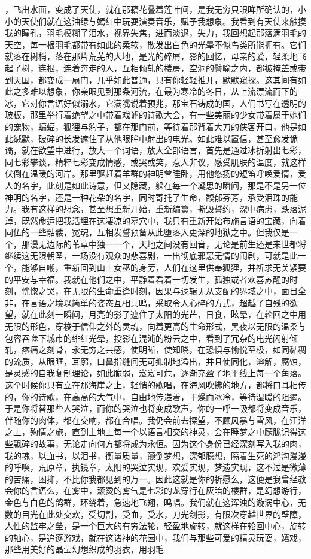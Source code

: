 \documentclass[UTF8]{article}
\begin{document}
，飞出水面，变成了天使，就在那藕花叠着莲叶间，是我无穷只眼眸所确认的，小小的天使们就在这油绿与嫣红中玩耍演奏音乐，赋予我想象。我看到有天使来触摸我的瞳孔，羽毛模糊了泪水，视界失焦，进而淡退，失力，我回想起那落满羽毛的天空，每一根羽毛都带有如此的柔软，散发出白色的光晕不似鸟类所能拥有。它们就落在树梢，落在那片荒芜的大地，是光的碎屑，影的回忆，母亲的爱，轻柔地飞起了树，连根，连着奔走的人，互相倾轧的楼房，空洞的譬喻之内，都被掩盖或带到天国，都变成一扇门，几乎如此普通，只有你轻轻推开，默默窥探。这其间有如此之多难以想象，你亲眼见到那条河流，在最为寒冷的冬日，从上流漂流而下的冰，它对你言语好似溺水，它满嘴说着预兆，那宝石铸成的国，人们书写在透明的玻板，那里举行着绝望之中带着戏谑的诗歌大会，有一些美丽的少女带着属于她们的宠物，蝙蝠，狐狸与豹子，都在那门前，等待着那背着大刀的侠客开口，他是如此缄默，破碎的长发遮住了从他眼眸中射出的电光。如此难以置信，甚至愈发诡谲，就在欲望中进行，放大一个词语，放大全部语言，首先是通过冰折射出七彩，同七彩攀谈，精粹七彩变成情感，或哭或笑，惹人非议，感受肌肤的温度，就这样伏倒在温暖的河岸。那里驱赶着羊群的神明曾睡卧，用他悠扬的短笛呼唤爱情，爱人的名字，此刻是如此诗意，但又隐藏，躲在每一个凝思的瞬间，那是不是另一位神明的名字，还是一种花朵的名字，同时寄托了生命，馥郁芬芳，承受泪珠的能力。我有这样的想念，甚至想重新开始，重新编纂，撕毁誓约，深中病患，跌落泥淖，既然命运把我活埋在这凄凉的墓穴中，我只有重新开始布施言语的宝藏，向着同伍的一些骷髅，冤魂，互相发誓预备从此堕落入更深的地狱之中。但我仅是一个，那漫无边际的苇草中独一一个，天地之间没有回音，无论是前生还是来世都将继续这无限朝圣，一场没有观众的悲喜剧，一出彻底邪恶无情的闹剧，可就是此一个，能够自嘲，重新回到山上女巫的身旁，人们在这里供奉狐狸，并祈求无关紧要的平安与幸福。我就在他们之中，平静着看着一切发生，孤独或者欢喜苏醒的时刻，恍惚之哭，在无限的生命重逢时刻，因果与逻辑无从支配的界域之中，面目全非，在言语之境以简单的姿态互相共鸣，采取令人心碎的方式，超越了自残的欲望，就在此刻一瞬间，月亮的影子遮住了太阳的光芒，日食，眩晕，在轮回之中用无限的形色，穿梭于信仰之外的灵魂，向着更高的生命形式，黑夜以无限的温柔与包容吞噬下城市的绯红光晕，投影在混沌的粉云之中，看到了冗杂的电光闪射倾轧，疼痛之刻骨，永无穷之共感，使明晰，使知晓，在恐惧与愉悦至极，如同黏稠的流质，从眼眶，耳廓，口鼻指缝间无可抑制地溢出，并且使同化，溶解，腐蚀，是灵感的自我复制理论，如此脆弱，岌岌可危，逐渐充盈了地平线上每一个角落。这个时候你只有立在那海崖之上，轻悄的歌唱，在海风吹拂的地方，都将口耳相传的，你的诗歌，在高高的大气中，自由地传递着，干燥而冰冷，等待湿暖的阻遏。于是你将替那些人哭泣，而你的哭泣也将变成歌声，你的一呼一吸都将变成音乐，伴随你的肉体，都在交响，都在合唱。我仍会前去探望，不顾风暴与雪风，在汪洋之上，殉情之旅，直到土地上每一个以语言相交的神灵，会在睡梦之中朦胧记得这些飘碎的故事，无论走向何方都将成为永恒。因为这个身份已经深刻写入我的肉，我的魂，以血书，以泪书，衡量质量，颠倒梦想，深郁臆想，隔着生死的鸿沟漫漫的呼唤，荒原章，执镜章，太阳的哭泣实现，欢爱实现，梦遗实现，这不过是微薄的苦痛，困抑，不比你我都见到的万一。因此这就是你的祈愿么，这便是我曾经教会你的言语么，在雾中，滚烫的雾气是七彩的龙穿行在灰暗的楼群，是幻想游行，金色与白色的鸽群，环绕着，急速地飞翔，鸣唱。我们就在这浑浊的漩涡中心，无数的目光在此处交欢，受切割，受血，受水，刀光剑影，有限次穿越世界的壁障，人性的监牢之垒，是一个巨大的有穷法轮，轻盈地旋转，就这样在轮回中心，旋转的轴心，是追逐游戏，就在这诸神的花园中，我们与那些可爱的精灵玩耍，嬉戏，那些用美好的晶莹幻想织成的羽衣，用羽毛
\end{document}
